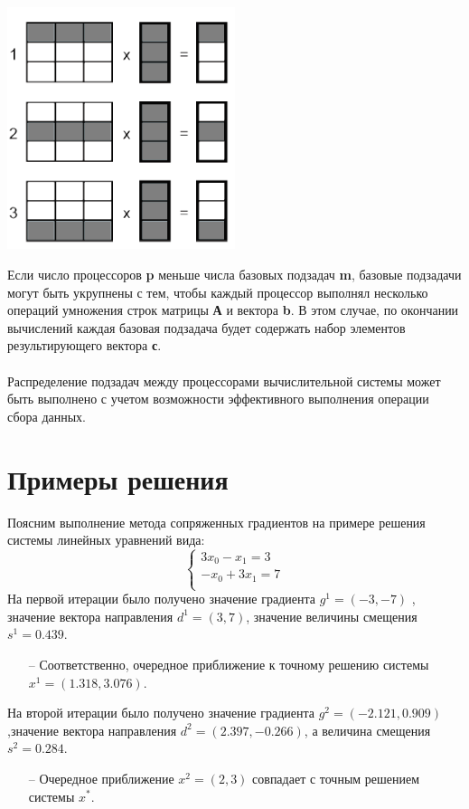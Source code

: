 \documentclass[12pt]{article}
\begin{document}
\begin{center}
\includegraphics[width=0.5\textwidth]{pic}
\end{center}
Если число процессоров \textbf{p} меньше числа базовых подзадач \textbf{m},  базовые подзадачи могут быть укрупнены с тем, чтобы каждый процессор выполнял несколько операций умножения строк матрицы \textbf{А} и вектора \textbf{b}. В этом случае, по окончании вычислений каждая базовая подзадача будет содержать набор элементов результирующего вектора \textbf{с}.
\\\\
Распределение подзадач между процессорами вычислительной системы может быть выполнено с учетом возможности эффективного выполнения операции сбора данных.

\section{\LARGE Примеры решения}
Поясним выполнение метода сопряженных градиентов на примере решения системы линейных уравнений вида:
\begin{equation*}
	\begin{cases}
	3x_0 - x_1 = 3\\
	-x_0 + 3x_1 = 7\\
	\end{cases}
\end{equation*}
На первой итерации было получено значение градиента $g^1 = (-3, -7)$ , значение вектора направления $d^1 = (3, 7)$, значение величины смещения $s^1 = 0.439$.
\begin{itemize}
	\item [--] Соответственно, очередное приближение к точному решению системы $x^1=(1.318, 3.076)$.
\end{itemize}
На второй итерации было получено значение градиента $g^2=(-2.121, 0.909)$ ,значение вектора направления $d^2=(2.397, -0.266)$, а величина смещения $s^2=0.284$.
\begin{itemize}
	\item [--] Очередное приближение $x^2=(2, 3)$ совпадает с точным решением системы $x^*$.
\end{itemize}
\end{document}
